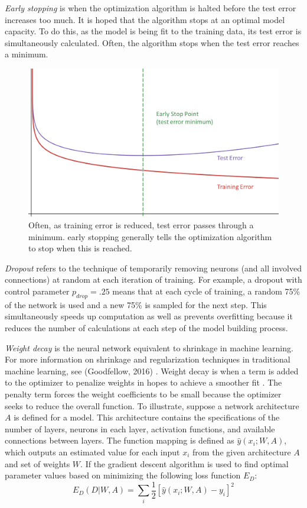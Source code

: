 \textit{Early stopping} is when the optimization algorithm is halted before the test error increases too much.  It is hoped that the algorithm stops at an optimal model capacity. To do this, as the model is being fit to the training data, its test error is simultaneously calculated. 
 Often, the algorithm stops when the test error reaches a minimum. \cite{doan2004generalization}

 \begin{figure}[H]
    \centering
    \vspace{-0pt}
    \includegraphics[width=0.5\linewidth]{Figures/early_stop.png}
    \caption{\footnotesize Often, as training error is reduced, test error passes through a minimum.  early stopping generally tells the optimization algorithm to stop when this is reached.}
    \label{earlystop}
\end{figure}

\textit{Dropout} refers to the technique of temporarily removing neurons (and all involved connections) at random  at each iteration of training.\cite{srivastava2014dropout}  For example, a dropout with control parameter $p_{drop} = .25$ means that at each cycle of training, a random 75\% of the network is used and a new 75\% is sampled for the next step. This simultaneously speeds up computation as well as prevents overfitting because it reduces the number of calculations at each step of the model building process.

\textit{Weight decay} is the neural network equivalent to shrinkage in machine learning.  For more information on shrinkage and regularization techniques in traditional machine learning, see (Goodfellow, 2016) \cite{Goodfellow-et-al-2016}.
Weight decay is when a  term is added to the optimizer to penalize weights in hopes to achieve a smoother fit \cite{mackay1992practical}.  The penalty term forces the weight coefficients to be small because the optimizer seeks to reduce the overall function.  To illustrate, suppose a network architecture $A$ is defined for a model.  This architecture contains the specifications of the number of layers, neurons in each layer, activation functions, and available connections between layers.  The function mapping is defined as $\hat{y}(x_i;W,A)$, which outputs an estimated value for each input $x_i$ from the given architecture $A$ and set of weights $W$.  If the gradient descent algorithm is used to find optimal parameter values based on minimizing the following loss function $E_D$:
$$
E_D(D|W,A) = \sum_i \frac{1}{2} [\hat{y}(x_i;W,A) - y_i]^2
$$

